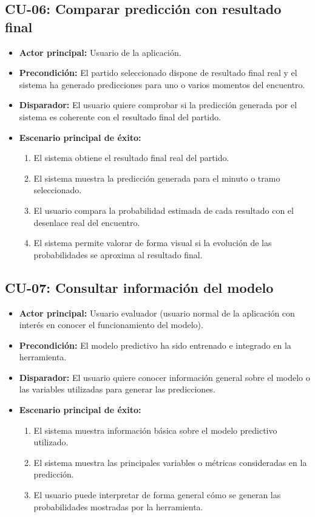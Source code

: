 \subsection*{CU-06: Comparar predicción con resultado final}

\begin{itemize}
    \item \textbf{Actor principal:} Usuario de la aplicación.
    \item \textbf{Precondición:} El partido seleccionado dispone de resultado final real y el sistema ha generado predicciones para uno o varios momentos del encuentro.
    \item \textbf{Disparador:} El usuario quiere comprobar si la predicción generada por el sistema es coherente con el resultado final del partido.
    \item \textbf{Escenario principal de éxito:}
          \begin{enumerate}
              \item El sistema obtiene el resultado final real del partido.
              \item El sistema muestra la predicción generada para el minuto o tramo seleccionado.
              \item El usuario compara la probabilidad estimada de cada resultado con el desenlace real del encuentro.
              \item El sistema permite valorar de forma visual si la evolución de las probabilidades se aproxima al resultado final.
          \end{enumerate}
\end{itemize}

\subsection*{CU-07: Consultar información del modelo}

\begin{itemize}
    \item \textbf{Actor principal:} Usuario evaluador (usuario normal de la aplicación con interés en conocer el funcionamiento del modelo).
    \item \textbf{Precondición:} El modelo predictivo ha sido entrenado e integrado en la herramienta.
    \item \textbf{Disparador:} El usuario quiere conocer información general sobre el modelo o las variables utilizadas para generar las predicciones.
    \item \textbf{Escenario principal de éxito:}
          \begin{enumerate}
              \item El sistema muestra información básica sobre el modelo predictivo utilizado.
              \item El sistema muestra las principales variables o métricas consideradas en la predicción.
              \item El usuario puede interpretar de forma general cómo se generan las probabilidades mostradas por la herramienta.
          \end{enumerate}
\end{itemize}


